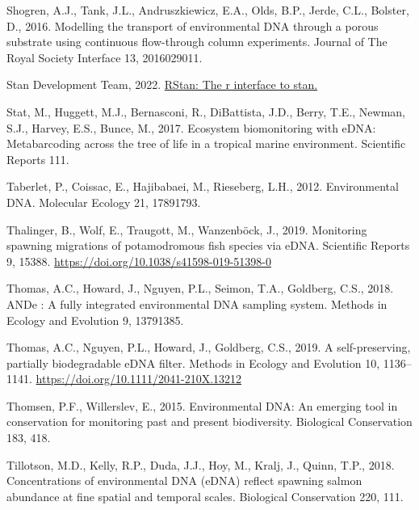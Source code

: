 \documentclass[
]{article}
\newlength{\cslhangindent}
\newlength{\cslentryspacingunit} %
\newenvironment{CSLReferences}[2] %
 {%
  \setlength{\parindent}{0pt}
  \ifodd #1
  \let\oldpar\par
  \def\par{\hangindent=\cslhangindent\oldpar}
  \fi
  \setlength{\parskip}{#2\cslentryspacingunit}
 }%
 {}
\begin{document}
\begin{CSLReferences}{1}{0}
\leavevmode{}%
Shogren, A.J., Tank, J.L., Andruszkiewicz, E.A., Olds, B.P., Jerde,
C.L., Bolster, D., 2016. Modelling the transport of environmental DNA
through a porous substrate using continuous flow-through column
experiments. Journal of The Royal Society Interface 13, 2016029011.

\leavevmode{}%
Stan Development Team, 2022. \href{https://mc-stan.org/}{RStan: The r
interface to stan.}

\leavevmode{}%
Stat, M., Huggett, M.J., Bernasconi, R., DiBattista, J.D., Berry, T.E.,
Newman, S.J., Harvey, E.S., Bunce, M., 2017. Ecosystem biomonitoring
with eDNA: Metabarcoding across the tree of life in a tropical marine
environment. Scientific Reports 111.

\leavevmode{}%
Taberlet, P., Coissac, E., Hajibabaei, M., Rieseberg, L.H., 2012.
Environmental DNA. Molecular Ecology 21, 17891793.

\leavevmode{}%
Thalinger, B., Wolf, E., Traugott, M., Wanzenböck, J., 2019. Monitoring
spawning migrations of potamodromous fish species via eDNA. Scientific
Reports 9, 15388. \url{https://doi.org/10.1038/s41598-019-51398-0}

\leavevmode{}%
Thomas, A.C., Howard, J., Nguyen, P.L., Seimon, T.A., Goldberg, C.S.,
2018. ANDe {\texttrademark}: A fully integrated environmental DNA
sampling system. Methods in Ecology and Evolution 9, 13791385.

\leavevmode{}%
Thomas, A.C., Nguyen, P.L., Howard, J., Goldberg, C.S., 2019. A
self-preserving, partially biodegradable eDNA filter. Methods in Ecology
and Evolution 10, 1136--1141.
\url{https://doi.org/10.1111/2041-210X.13212}

\leavevmode{}%
Thomsen, P.F., Willerslev, E., 2015. Environmental DNA: An emerging tool
in conservation for monitoring past and present biodiversity. Biological
Conservation 183, 418.

\leavevmode{}%
Tillotson, M.D., Kelly, R.P., Duda, J.J., Hoy, M., Kralj, J., Quinn,
T.P., 2018. Concentrations of environmental DNA (eDNA) reflect spawning
salmon abundance at fine spatial and temporal scales. Biological
Conservation 220, 111.


\end{CSLReferences}
\end{document}
